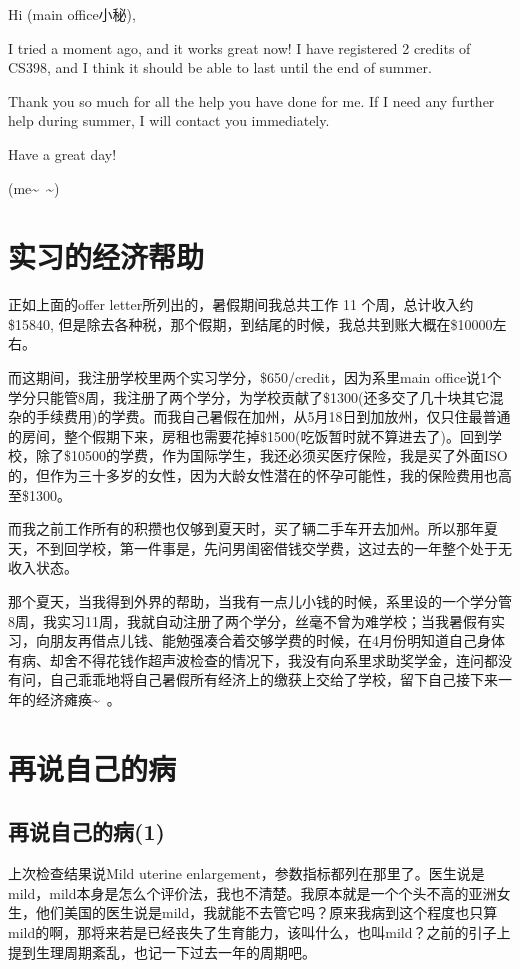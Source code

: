 \documentclass[12pt]{book}
\begin{document}
Hi (main office小秘), 

I tried a moment ago, and it works great now!
I have registered 2 credits of CS398, and I think it should be able to last until the end of summer. 

Thank you so much for all the help you have done for me. If I need any further help during summer, I will contact you immediately. 

Have a great day!

(me\textasciitilde{}~\textasciitilde{})

\chapter{实习的经济帮助}
\label{sec-42}

正如上面的offer letter所列出的，暑假期间我总共工作 11 个周，总计收入约\$15840, 但是除去各种税，那个假期，到结尾的时候，我总共到账大概在\$10000左右。

而这期间，我注册学校里两个实习学分，\$650/credit，因为系里main office说1个学分只能管8周，我注册了两个学分，为学校贡献了\$1300(还多交了几十块其它混杂的手续费用)的学费。而我自己暑假在加州，从5月18日到加放州，仅只住最普通的房间，整个假期下来，房租也需要花掉\$1500(吃饭暂时就不算进去了)。回到学校，除了\$10500的学费，作为国际学生，我还必须买医疗保险，我是买了外面ISO的，但作为三十多岁的女性，因为大龄女性潜在的怀孕可能性，我的保险费用也高至\$1300。

而我之前工作所有的积攒也仅够到夏天时，买了辆二手车开去加州。所以那年夏天，不到回学校，第一件事是，先问男闺密借钱交学费，这过去的一年整个处于无收入状态。

那个夏天，当我得到外界的帮助，当我有一点儿小钱的时候，系里设的一个学分管8周，我实习11周，我就自动注册了两个学分，丝毫不曾为难学校；当我暑假有实习，向朋友再借点儿钱、能勉强凑合着交够学费的时候，在4月份明知道自己身体有病、却舍不得花钱作超声波检查的情况下，我没有向系里求助奖学金，连问都没有问，自己乖乖地将自己暑假所有经济上的缴获上交给了学校，留下自己接下来一年的经济瘫痪\textasciitilde{}~。

\chapter{再说自己的病}
\label{sec-43}
\section{再说自己的病(1)}
\label{sec-43-1}

上次检查结果说Mild uterine enlargement，参数指标都列在那里了。医生说是mild，mild本身是怎么个评价法，我也不清楚。我原本就是一个个头不高的亚洲女生，他们美国的医生说是mild，我就能不去管它吗？原来我病到这个程度也只算mild的啊，那将来若是已经丧失了生育能力，该叫什么，也叫mild？之前的引子上提到生理周期紊乱，也记一下过去一年的周期吧。
\end{document}
